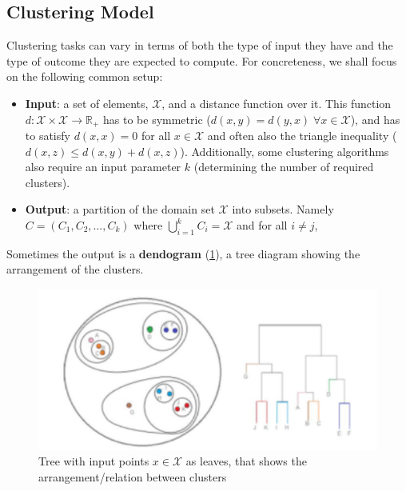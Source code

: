 \documentclass[12pt]{report}
\theoremstyle{plain}
\newcommand\mcl[1]{\mathcal{#1}}
\begin{document}
\begin{flushleft}
\subsection{Clustering Model}
Clustering tasks can vary in terms of both the type of input they have and the type of outcome they are expected to compute. For concreteness, we shall focus on the following common setup:
\begin{itemize}
	\item \textbf{Input}: a set of elements, $\mcl{X}$, and a distance function over it. This function $d:\mcl{X}\times\mcl{X}\to\mathds{R}_+$ has to be symmetric ($d(x,y)=d(y,x)\;\forall x\in\mcl{X}$), and has to satisfy $d(x,x)=0$ for all $x\in\mcl{X}$ and often also the triangle inequality ($d(x,z)\leq d(x,y)+d(x,z)$). Additionally, some clustering algorithms also require an input parameter $k$ (determining the number of required clusters).
	\item \textbf{Output}: a partition of the domain set $\mcl{X}$ into subsets. Namely $C=(C_1,C_2,\dots,C_k)$ where $\bigcup_{i=1}^k C_i=\mcl{X}$ and for all $i\neq j$,%
\end{itemize}
Sometimes the output is a \textbf{dendogram} (\ref{fig:dendogram}), a tree diagram showing the arrangement of the clusters.
\begin{figure}[!h]
	\centering
	\includegraphics[scale=1]{images/dendogram.pdf}
	\caption{Tree with input points $x\in\mcl{X}$ as leaves, that shows the arrangement/relation between clusters}
	\label{fig:dendogram}
\end{figure}


\end{flushleft}
\end{document}
